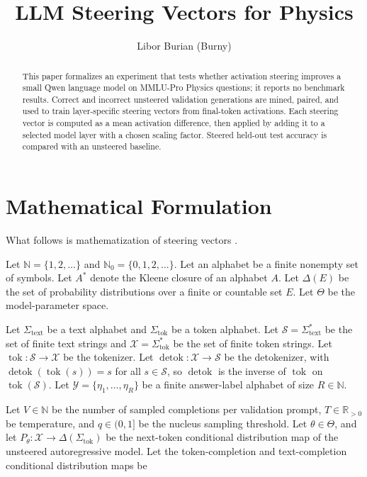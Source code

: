\documentclass{article}
\title{LLM Steering Vectors for Physics}
\author{Libor Burian (Burny)}
\date{}
\begin{document}
\maketitle

\begin{abstract}
This paper formalizes an experiment that tests whether activation steering improves a small Qwen language model on MMLU-Pro Physics questions; it reports no benchmark results. Correct and incorrect unsteered validation generations are mined, paired, and used to train layer-specific steering vectors from final-token activations. Each steering vector is computed as a mean activation difference, then applied by adding it to a selected model layer with a chosen scaling factor. Steered held-out test accuracy is compared with an unsteered baseline.
\end{abstract}

\section{Mathematical Formulation}

What follows is mathematization of steering vectors \cite{turner2023activation}.

Let \(\mathbb N=\{1,2,\ldots\}\) and \(\mathbb N_0=\{0,1,2,\ldots\}\).
Let an alphabet be a finite nonempty set of symbols.
Let \(A^*\) denote the Kleene closure of an alphabet \(A\).
Let \(\Delta(E)\) be the set of probability distributions over a finite or countable set \(E\).
Let \(\Theta\) be the model-parameter space.

Let \(\Sigma_{\mathrm{text}}\) be a text alphabet and \(\Sigma_{\mathrm{tok}}\) be a token alphabet.
Let \(\mathcal S=\Sigma_{\mathrm{text}}^*\) be the set of finite text strings and \(\mathcal X=\Sigma_{\mathrm{tok}}^*\) be the set of finite token strings.
Let \(\operatorname{tok}:\mathcal S\to\mathcal X\) be the tokenizer.
Let \(\operatorname{detok}:\mathcal X\to\mathcal S\) be the detokenizer, with \(\operatorname{detok}(\operatorname{tok}(s))=s\) for all \(s\in\mathcal S\), so \(\operatorname{detok}\) is the inverse of \(\operatorname{tok}\) on \(\operatorname{tok}(\mathcal S)\).
Let \(\mathcal Y=\{\eta_1,\ldots,\eta_R\}\) be a finite answer-label alphabet of size \(R\in\mathbb N\).

Let \(V\in\mathbb N\) be the number of sampled completions per validation prompt, \(T\in\mathbb R_{>0}\) be temperature, and \(q\in(0,1]\) be the nucleus sampling threshold.
Let \(\theta\in\Theta\), and let \(P_\theta:\mathcal X\to\Delta(\Sigma_{\mathrm{tok}})\) be the next-token conditional distribution map of the unsteered autoregressive model.
Let the token-completion and text-completion conditional distribution maps be
\end{document}
